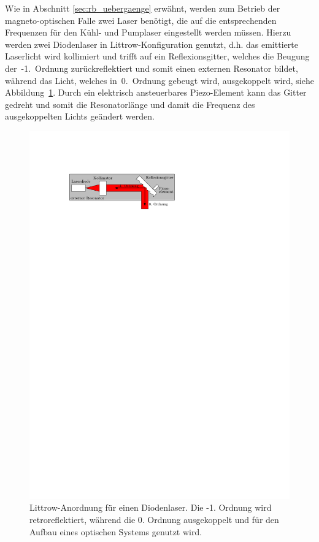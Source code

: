 \documentclass[11pt, a4paper]{article}
\numberwithin{equation}{section}
\begin{document}
Wie in Abschnitt \ref{sec:rb_uebergaenge} erwähnt, werden zum Betrieb der magneto-optischen Falle zwei Laser benötigt, die auf die entsprechenden Frequenzen für den Kühl- und Pumplaser eingestellt werden müssen.
Hierzu werden zwei Diodenlaser in Littrow-Konfiguration genutzt, d.h. das emittierte Laserlicht wird kollimiert und trifft auf ein Reflexionsgitter, welches die Beugung der~-1.~Ordnung zurückreflektiert und somit einen externen Resonator bildet, während das Licht, welches in~0.~Ordnung gebeugt wird, ausgekoppelt wird, siehe Abbildung~\ref{fig:littrow}.
Durch ein elektrisch ansteuerbares Piezo-Element kann das Gitter gedreht und somit die Resonatorlänge und damit die Frequenz des ausgekoppelten Lichts geändert werden.
\begin{figure}[h]
	\centering
	\includegraphics[width=.7\textwidth]{./figures/theory/littrow}
	\caption{Littrow-Anordnung für einen Diodenlaser. Die -1. Ordnung wird retroreflektiert, während die 0. Ordnung ausgekoppelt und für den Aufbau eines optischen Systems genutzt wird.}
	\label{fig:littrow}
\end{figure}
\end{document}
